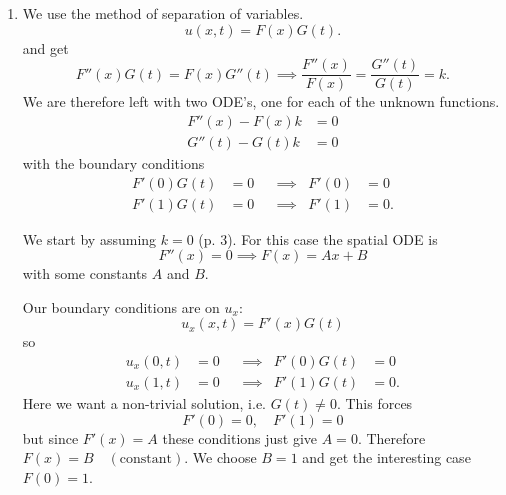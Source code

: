 \begin{derivation}
  \begin{enumerate}[label=\alph*)]
    \item We use the method of separation of variables.
      \begin{equation*}
        u(x,t) = F(x) G(t)
      .\end{equation*}
      and get
      \begin{equation*}
        F''(x) G(t) = F(x) G''(t) \implies \frac{F''(x)}{F(x)} = \frac{G''(t)}{G(t)} = k
      .\end{equation*}
      We are therefore left with two ODE's, one for each of the unknown functions.
      \begin{align*}
        F''(x) - F(x) k &= 0 \\
        G''(t) - G(t) k &= 0
      \end{align*}
      with the boundary conditions
      \begin{align*}
        F'(0) G(t) &= 0 & &\implies & F'(0) &= 0 \\
        F'(1) G(t) &= 0 & &\implies & F'(1) &= 0
      .\end{align*}

      We start by assuming $k = 0$ (p. 3).
      For this case the spatial ODE is
      \begin{equation*}
        F''(x) = 0 \implies F(x) = Ax + B
      \end{equation*}
      with some constants $A$ and $B$.

      Our boundary conditions are on $u_x$:
      \begin{equation*}
        u_x(x,t) = F'(x) G(t)
      \end{equation*}
      so
      \begin{align*}
        u_x(0,t) &= 0 & &\implies & F'(0) G(t) &= 0 \\
        u_x(1,t) &= 0 & &\implies & F'(1) G(t) &= 0
      .\end{align*}
      Here we want a non-trivial solution, i.e. $G(t) \neq 0$.
      This forces
      \begin{equation*}
        F'(0) = 0, \quad F'(1) = 0
      \end{equation*}
      but since $F'(x) = A$ these conditions just give $A = 0$.
      Therefore $F(x) = B \quad (\text{constant})$.
      We choose $B = 1$ and get the interesting case $F(0) = 1$.


\end{enumerate}
\end{derivation}
